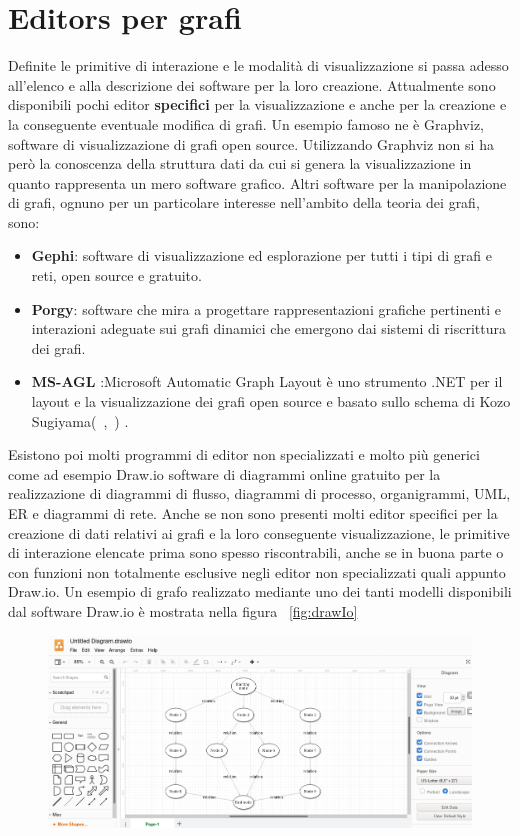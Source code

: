 {\section{Editors per grafi}
Definite le primitive di interazione e le modalità di visualizzazione si passa adesso all'elenco e alla descrizione dei software per la loro creazione.
Attualmente sono disponibili pochi editor \textbf{specifici} per la visualizzazione e anche per la creazione e la conseguente eventuale modifica di grafi. Un esempio famoso ne è Graphviz, software di visualizzazione di grafi open source. Utilizzando Graphviz non si ha però la conoscenza della struttura dati da cui si genera la visualizzazione in quanto rappresenta un mero software grafico.
Altri software per la manipolazione di grafi, ognuno per un particolare interesse nell'ambito della teoria dei grafi, sono:
\begin{itemize}
	\item \textbf{Gephi}: software di visualizzazione ed esplorazione per tutti i tipi di grafi e reti, open source e gratuito.
	\item \textbf{Porgy}: software che mira a progettare rappresentazioni grafiche pertinenti e interazioni adeguate sui grafi dinamici che emergono dai sistemi di riscrittura dei grafi.
	\item \textbf{MS-AGL }:Microsoft Automatic Graph Layout è uno strumento .NET per il layout e la visualizzazione dei grafi open source e basato sullo schema di Kozo Sugiyama(~\cite{108304},~\cite{SUGIYAMA1995217}) .   
\end{itemize}
Esistono poi molti programmi di editor non specializzati e molto più generici come ad esempio Draw.io software di diagrammi online gratuito per la realizzazione di diagrammi di flusso, diagrammi di processo, organigrammi, UML, ER e diagrammi di rete. Anche se non sono presenti molti editor specifici per la creazione di dati relativi ai grafi e la loro conseguente visualizzazione, le primitive di interazione elencate prima sono spesso riscontrabili, anche se in buona parte o con funzioni non totalmente esclusive negli editor non specializzati quali appunto Draw.io.
Un esempio di grafo realizzato mediante uno dei tanti modelli disponibili dal software Draw.io è mostrata nella figura \figurename~\ref{fig:drawIo}
\begin{figure}[!htb]
	\begin{center}
		\includegraphics[width=0.8 \linewidth]{figure/drawIo}

\end{center}
\end{figure}}

